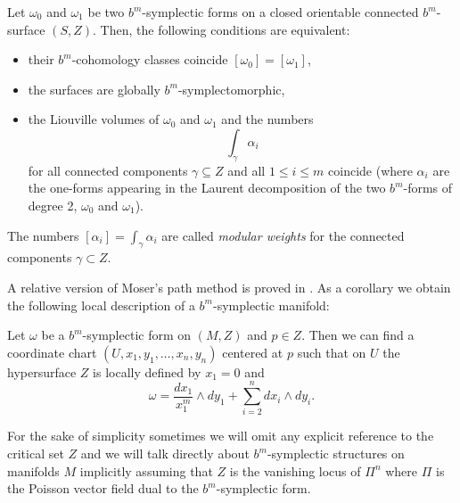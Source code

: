 \begin{theorem}\label{thm:scott}
Let $\omega_0$ and $\omega_1$ be two $b^m$-symplectic forms on a {closed orientable} connected $b^m$-surface $(S,Z)$.
Then, the following conditions are equivalent:
\begin{itemize}

  \item their $b^m$-cohomology classes coincide $[\omega_0] = [\omega_1]$,
  \item the surfaces are globally $b^m$-symplectomorphic,
  \item the Liouville volumes of $\omega_0$ and $\omega_1$ and the numbers $$\int_{\gamma} \alpha_{i}$$ for all connected
  components $\gamma \subseteq Z$ and all $1 \leq i \leq m$ coincide (where
  $\alpha_{i}$ are the one-forms appearing in the Laurent decomposition
  of the two $b^m$-forms {of degree 2}, $\omega_0$ and $\omega_1$).
\end{itemize}
\end{theorem}

\begin{definition}
The numbers $[\alpha_i] = \int_\gamma \alpha_i$ are called \emph{modular weights} for the connected components $\gamma \subset Z$.
\end{definition}

{A relative version of Moser's path method is proved in \cite{GMW17}. As a corollary we obtain the following local description of a $b^m$-symplectic manifold:}

\begin{theorem}\label{theorem:Darbouxbn}
Let $\omega$ be a $b^m$-symplectic form on $(M,Z)$ and $p\in Z$. Then we can find a coordinate chart $(U,x_1,y_1,\ldots,x_n,y_n)$ centered at
$p$ such that on $U$ the hypersurface $Z$ is locally defined by $x_1=0$ and
$$\omega=\frac{d x_1}{x_1^m}\wedge {d y_1}+\sum_{i=2}^n d x_i\wedge d y_i.$$
\end{theorem}



{
\begin{remark}
 For the sake of simplicity sometimes we will omit any explicit reference to the critical set  $Z$ and we will talk directly about $b^m$-symplectic structures on manifolds $M$ implicitly assuming that $Z$ is the vanishing locus of  $\Pi^n$  where $\Pi$ is the Poisson vector field dual to the $b^m$-symplectic form.
\end{remark}
}


